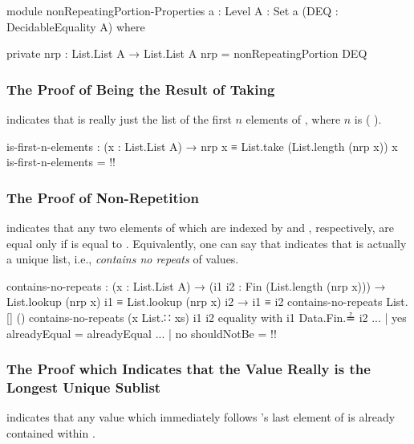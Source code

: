 \documentclass{report}
\begin{document}
\begin{code}
module nonRepeatingPortion-Properties
  {a : Level}
  {A : Set a}
  (DEQ : DecidableEquality A) where

  private
    nrp : List.List A → List.List A
    nrp = nonRepeatingPortion DEQ
\end{code}

\subsubsection{The Proof of Being the Result of Taking}
  indicates that   is really just the list of the first \(n\) elements of , where \(n\) is  \AgdaSymbol( \AgdaSymbol).

\begin{code}
  is-first-n-elements :
    (x : List.List A) →
    nrp x ≡ List.take (List.length (nrp x)) x
  is-first-n-elements = {!!}
\end{code}

\subsubsection{The Proof of Non-Repetition}
  indicates that any two elements of   which are indexed by  and , respectively, are equal only if  is equal to .  Equivalently, one can say that   indicates that   is actually a unique list, i.e., \emph{contains no repeats} of values.

\begin{code}
  contains-no-repeats :
    (x : List.List A) →
    (i1 i2 : Fin (List.length (nrp x))) →
    List.lookup (nrp x) i1 ≡ List.lookup (nrp x) i2 →
    i1 ≡ i2
  contains-no-repeats List.[] ()
  contains-no-repeats (x List.∷ xs) i1 i2 equality with i1 Data.Fin.≟ i2
  ... | yes alreadyEqual = alreadyEqual
  ... | no shouldNotBe = {!!}
\end{code}

\subsubsection{The Proof which Indicates that the Value Really is the Longest Unique Sublist}
  indicates that any value which immediately follows  's last element of  is already contained within  .
\end{document}
